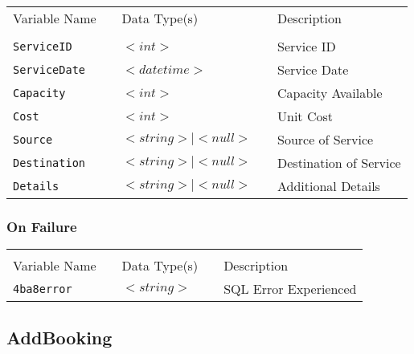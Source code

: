 \begin{tabular}{lllll}
Variable Name	&		&	Data Type(s)		&	&	Description	\\
				&	&	&	&	\\
\verb!ServiceID! & \hspace{15mm} & $<int>$ & \hspace{15mm} & Service ID \\
\verb!ServiceDate! & \hspace{15mm} & $<datetime>$ & \hspace{15mm} & Service Date \\
\verb!Capacity! & \hspace{15mm} & $<int>$ & \hspace{15mm} & Capacity Available \\
\verb!Cost! & \hspace{15mm} & $<int>$ & \hspace{15mm} & Unit Cost \\
\verb!Source! & \hspace{15mm} & $<string> \mid <null>$ & \hspace{15mm} & Source of Service \\
\verb!Destination! & \hspace{15mm} & $<string> \mid  <null>$ & \hspace{15mm} & Destination of Service \\
\verb!Details! & \hspace{15mm} & $<string> \mid <null>$ & \hspace{15mm} & Additional Details \\
\end{tabular}
\subsubsection{On Failure}

\begin{tabular}{lllll}
				&	&	&	&	\\
Variable Name	&		&	Data Type(s)		&	&	Description	\\
\verb!4ba8error! & \hspace{15mm} & $<string>$ & \hspace{15mm} & SQL Error Experienced \\
\end{tabular}


\subsection{AddBooking}

